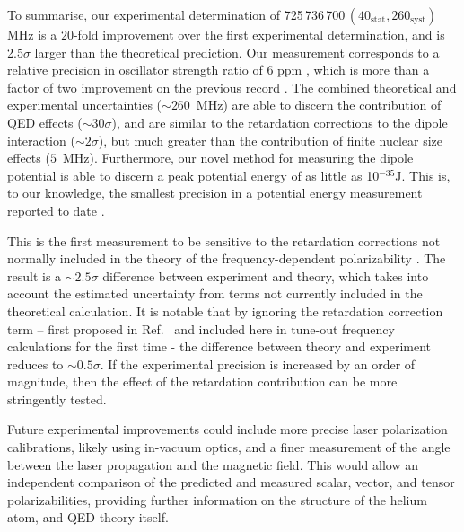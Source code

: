 \documentclass[12pt]{article}
\begin{document}
 To summarise, our experimental determination of 725\,736\,700\,$(40_{\mathrm{stat}},260_{\mathrm{syst}})$ MHz is a \(20\)-fold improvement over the first experimental determination, and is 2.5$\sigma$ larger than the theoretical prediction. Our measurement corresponds to a relative precision in oscillator strength ratio of 6 ppm \cite{SOMs}, which is more than a factor of two improvement on the previous record \cite{PhysRevA.92.052501}. The combined theoretical and experimental uncertainties (\({\sim} 260\)~MHz) are able to discern the contribution of QED effects (\({\sim} 30 \sigma\)), and are similar to the retardation corrections to the dipole interaction (\({\sim} 2 \sigma\)), but much greater than the contribution of finite nuclear size effects (\(5\)~MHz). Furthermore, our novel method for measuring the dipole potential is able to discern a peak potential energy of as little as 10$^{-35}$J. This is, to our knowledge, the smallest precision in a potential energy measurement reported to date \cite{SOMs}.

 
 
This is the first measurement to be sensitive to the retardation corrections not normally included in the theory of the frequency-dependent polarizability \cite{Drake2019, PhysRevA.99.041803}. The result is a \({\sim} 2.5 \sigma\) difference between experiment and theory, which takes into account the estimated uncertainty from terms not currently included in the theoretical calculation.  It is notable that by ignoring the retardation correction term – first proposed in Ref.~\cite{PhysRevA.99.041803} and included here in tune-out frequency calculations for the first time - the difference between theory and experiment reduces to \({\sim} 0.5 \sigma\).  If the experimental precision is increased by an order of magnitude, then the effect of the retardation contribution can be more stringently tested.

 
Future experimental improvements could include more precise laser polarization calibrations, likely using in-vacuum optics, and a finer measurement of the angle between the laser propagation and the magnetic field. This would allow an independent comparison of the predicted and measured scalar, vector, and tensor polarizabilities, providing further information on the structure of the helium atom, and QED theory itself.
\end{document}
